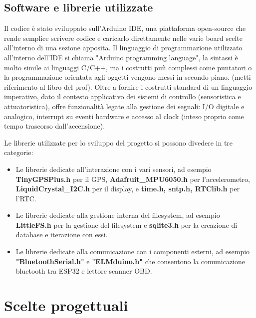 \documentclass[12pt, a4paper, italian]{report}
\numberwithin{figure}{chapter}
\numberwithin{table}{chapter}
\begin{document}
\subsection{Software e librerie utilizzate}
Il codice è stato sviluppato sull'Arduino IDE, una piattaforma open-source che rende semplice scrivere codice e caricarlo direttamente nelle varie board scelte all'interno di una sezione apposita. Il linguaggio di programmazione utilizzato all'interno dell'IDE si chiama "Arduino programming language", la sintassi è molto simile ai linguaggi C/C++, ma i costrutti puù complessi come puntatori o la programmazione orientata agli oggetti vengono messi in secondo piano. (metti riferimento al libro del prof). Oltre a fornire i costrutti standard di un linguaggio imperativo, dato il contesto applicativo dei sistemi di controllo (sensoristica e attuatoristica), offre funzionalità legate alla gestione dei segnali: I/O digitale e analogico, interrupt su eventi hardware e accesso al clock (inteso proprio come tempo trascorso dall'accensione).

Le librerie utilizzate per lo sviluppo del progetto si possono divedere in tre categorie:

\begin{itemize}
    \item Le librerie dedicate all'interazione con i vari sensori, ad esempio \textbf{TinyGPSPlus.h} per il GPS, \textbf{Adafruit\_MPU6050.h} per l'accelerometro, \textbf{LiquidCrystal\_I2C.h} per il display, e \textbf{time.h, sntp.h, RTClib.h} per l'RTC.
    \item Le librerie dedicate alla gestione interna del filesystem, ad esempio \textbf{LittleFS.h} per la gestione del filesystem e \textbf{sqlite3.h} per la creazione di database e iterazione con essi.
    \item Le librerie dedicate alla comunicazione con i componenti esterni, ad esempio \textbf{"BluetoothSerial.h"} e \textbf{"ELMduino.h"} che consentono la comunicazione bluetooth tra ESP32 e lettore scanner OBD.
\end{itemize}

\section{Scelte progettuali}
\end{document}
